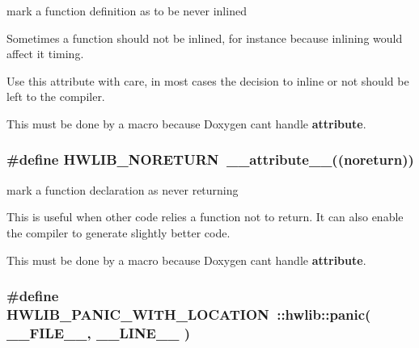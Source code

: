 mark a function definition as to be never inlined 

Sometimes a function should not be inlined, for instance because inlining would affect it timing.

Use this attribute with care, in most cases the decision to inline or not should be left to the compiler.

This must be done by a macro because Doxygen can\textquotesingle{}t handle {\bfseries attribute}. 
\subsubsection[{\texorpdfstring{H\+W\+L\+I\+B\+\_\+\+N\+O\+R\+E\+T\+U\+RN}{HWLIB_NORETURN}}]{\setlength{\rightskip}{0pt plus 5cm}\#define H\+W\+L\+I\+B\+\_\+\+N\+O\+R\+E\+T\+U\+RN~\+\_\+\+\_\+attribute\+\_\+\+\_\+((noreturn))}\hypertarget{hwlib-defines_8hpp_aef311f1f416fdcbd1fa22376dcc01029}{}\label{hwlib-defines_8hpp_aef311f1f416fdcbd1fa22376dcc01029}


mark a function declaration as never returning 

This is useful when other code relies a function not to return. It can also enable the compiler to generate slightly better code.

This must be done by a macro because Doxygen can\textquotesingle{}t handle {\bfseries attribute}. 
\subsubsection[{\texorpdfstring{H\+W\+L\+I\+B\+\_\+\+P\+A\+N\+I\+C\+\_\+\+W\+I\+T\+H\+\_\+\+L\+O\+C\+A\+T\+I\+ON}{HWLIB_PANIC_WITH_LOCATION}}]{\setlength{\rightskip}{0pt plus 5cm}\#define H\+W\+L\+I\+B\+\_\+\+P\+A\+N\+I\+C\+\_\+\+W\+I\+T\+H\+\_\+\+L\+O\+C\+A\+T\+I\+ON~\+::hwlib\+::panic( \+\_\+\+\_\+\+F\+I\+L\+E\+\_\+\+\_\+, \+\_\+\+\_\+\+L\+I\+N\+E\+\_\+\+\_\+ )}\hypertarget{hwlib-defines_8hpp_a63e41f8f1231b208819549fe26a58440}{}\label{hwlib-defines_8hpp_a63e41f8f1231b208819549fe26a58440}


